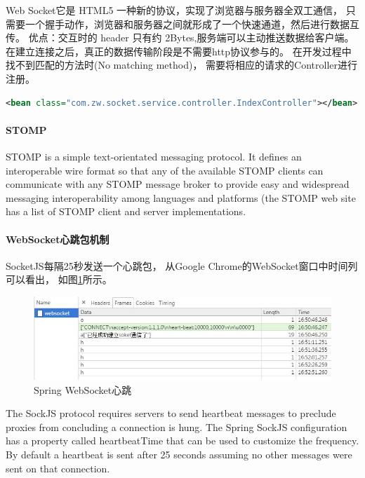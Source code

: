 \documentclass{book}
\begin{document}
Web Socket它是 HTML5 一种新的协议，实现了浏览器与服务器全双工通信，
只需要一个握手动作，浏览器和服务器之间就形成了一个快速通道，然后进行数据互传。
优点：交互时的 header 只有约 2Bytes,服务端可以主动推送数据给客户端。
在建立连接之后，真正的数据传输阶段是不需要http协议参与的。
在开发过程中找不到匹配的方法时(No matching method)，
需要将相应的请求的Controller进行注册。

\begin{lstlisting}[language=XML]
<bean class="com.zw.socket.service.controller.IndexController"></bean>
\end{lstlisting}

\paragraph{STOMP}

STOMP is a simple text-orientated messaging protocol. 
It defines an interoperable wire format so that any of 
the available STOMP clients can communicate with any STOMP 
message broker to provide easy and widespread messaging 
interoperability among languages and platforms 
(the STOMP web site has a list of STOMP client and server implementations.

\paragraph{WebSocket心跳包机制}

SocketJS每隔25秒发送一个心跳包，
从Google Chrome的WebSocket窗口中时间列可以看出，
如图\ref{fig:WebSocketHeartbeat}所示。

\begin{figure}[htbp]
	\centering
	\includegraphics[scale=0.5]{WebSocketHeartbeat.jpg}
	\caption{Spring WebSocket心跳}
	\label{fig:WebSocketHeartbeat}
\end{figure}

The SockJS protocol requires servers to send heartbeat messages 
to preclude proxies from concluding a connection is hung. 
The Spring SockJS configuration has a property called heartbeatTime that can be used to customize the frequency. 
By default a heartbeat is sent after 25 seconds assuming no other messages were sent on that connection. 
\end{document}
